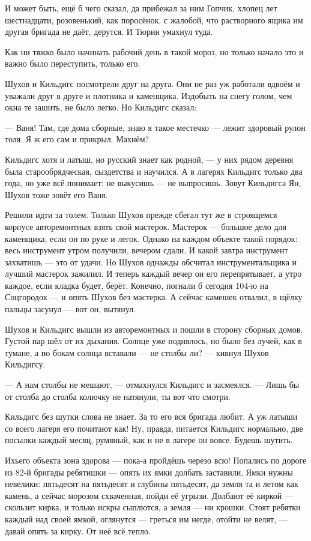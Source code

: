 И может быть, ещё б чего сказал, да прибежал за ним Гопчик, хлопец лет шестнадцати, розовенький, как поросёнок, с жалобой, что растворного ящика им другая бригада не даёт, дерутся. И Тюрин умахнул туда.

Как ни тяжко было начинать рабочий день в такой мороз, но только начало это и важно было переступить, только его.

Шухов и Кильдигс посмотрели друг на друга. Они не раз уж работали вдвоём и уважали друг в друге и плотника и каменщика. Издобыть на снегу голом, чем окна те зашить, не было легко. Но Кильдигс сказал:

--- Ваня! Там, где дома сборные, знаю я такое местечко --- лежит здоровый рулон толя. Я ж его сам и прикрыл. Махнём?

Кильдигс хотя и латыш, но русский знает как родной, --- у них рядом деревня была старообрядческая, сыздетства и научился. А в лагерях Кильдигс только два года, но уже всё понимает: не выкусишь --- не выпросишь. Зовут Кильдигса Ян, Шухов тоже зовёт его Ваня.

Решили идти за толем. Только Шухов прежде сбегал тут же в строящемся корпусе авторемонтных взять свой мастерок. Мастерок --- большое дело для каменщика, если он по руке и легок. Однако на каждом объекте такой порядок: весь инструмент утром получили, вечером сдали. И какой завтра инструмент захватишь --- это от удачи. Но Шухов однажды обсчитал инструментальщика и лучший мастерок зажилил. И теперь каждый вечер он его перепрятывает, а утро каждое, если кладка будет, берёт. Конечно, погнали б сегодня 104-ю на Соцгородок --- и опять Шухов без мастерка. А сейчас камешек отвалил, в щёлку пальцы засунул --- вот он, вытянул.

Шухов и Кильдигс вышли из авторемонтных и пошли в сторону сборных домов. Густой пар шёл от их дыхания. Солнце уже поднялось, но было без лучей, как в тумане, а по бокам солнца вставали --- не столбы ли? --- кивнул Шухов Кильдигсу.

--- А нам столбы не мешают, --- отмахнулся Кильдигс и засмеялся. --- Лишь бы от столба до столба колючку не натянули, ты вот что смотри.

Кильдигс без шутки слова не знает. За то его вся бригада любит. А уж латыши со всего лагеря его почитают как! Ну, правда, питается Кильдигс нормально, две посылки каждый месяц, румяный, как и не в лагере он вовсе. Будешь шутить.

Ихьего объекта зона здорова --- пока-а пройдёшь черезо всю! Попались по дороге из 82-й бригады ребятишки --- опять их ямки долбать заставили. Ямки нужны невелики: пятьдесят на пятьдесят и глубины пятьдесят, да земля та и летом как камень, а сейчас морозом схваченная, пойди её угрызи. Долбают её киркой --- скользит кирка, и только искры сыплются, а земля --- ни крошки. Стоят ребятки каждый над своей ямкой, оглянутся --- греться им негде, отойти не велят, --- давай опять за кирку. От неё всё тепло.

